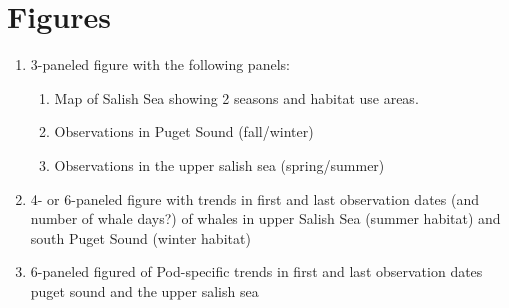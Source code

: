 \documentclass{article}
\begin{document}
\section* {Figures}
\begin{enumerate}
\item 3-paneled figure with the following panels: 
\begin{enumerate}
\item Map of Salish Sea showing 2 seasons and habitat use areas.
\item Observations in Puget Sound (fall/winter)
\item Observations in the upper salish sea (spring/summer)
\end{enumerate}
\item 4- or 6-paneled figure with trends in first and last observation dates (and number of whale days?) of whales in upper Salish Sea (summer habitat) and south Puget Sound (winter habitat)
\item 6-paneled figured of Pod-specific trends in first and last observation dates puget sound and the upper salish sea

\end{enumerate}

\end{document}
